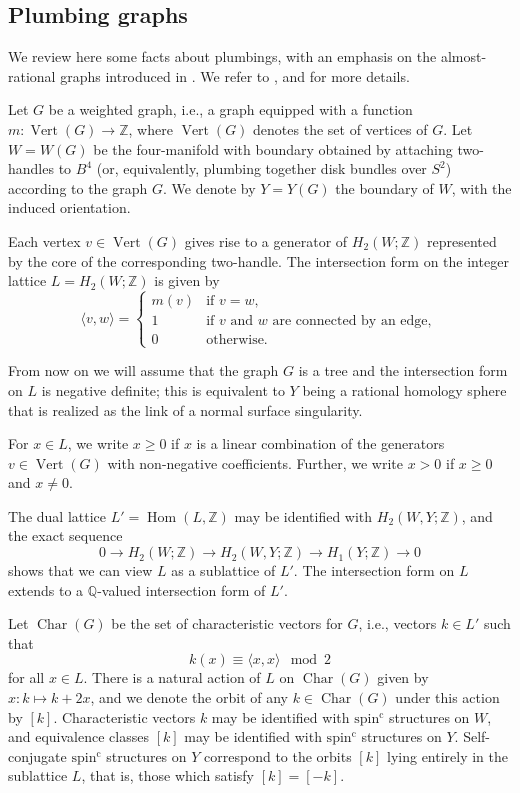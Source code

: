 \documentclass[11 pt]{amsart}
\theoremstyle{remark}
\newcommand\Z{\mathbb{Z}}
\newcommand\Q{\mathbb{Q}}
\def\spinc {{\operatorname{spin^c}}}
\DeclareMathOperator{\Hom}{Hom}
\def\Vert{\operatorname{Vert}}
\def\Char{\operatorname{Char}}
\begin{document}

\subsection{Plumbing graphs}
\label{sec:pg}
We review here some facts about plumbings, with an emphasis on the almost-rational graphs introduced in \cite{NemethiOS}. We refer to \cite{Neu}, \cite{Plumbed} and \cite{NemethiOS} for more details.

Let $G$ be a weighted graph, i.e., a graph equipped with a function $m: \Vert(G) \to \Z$, where $\Vert(G)$ denotes the set of vertices of $G$. Let $W=W(G)$ be the four-manifold with boundary obtained by attaching two-handles to $B^4$ (or, equivalently, plumbing together disk bundles over $S^2$) according to the graph $G$. We denote by $Y=Y(G)$ the boundary of $W$, with the induced orientation.

Each vertex $v \in \Vert(G)$ gives rise to a generator of $H_2(W; \Z)$ represented by the core of the corresponding two-handle. The intersection form on the integer lattice $L = H_2(W; \Z)$ is given by
$$ \langle v, w \rangle = \begin{cases}
m(v) & \text{if $v=w$},\\
1 & \text{if $v$ and $w$ are connected by an edge},\\
0 & \text{otherwise.}
\end{cases}$$

From now on we will assume that the graph $G$ is a tree and the intersection form on $L$ is negative definite; this is equivalent to $Y$ being a rational homology sphere that is realized as the link of a  normal surface singularity. 

For $x \in L$, we write $x \geq 0$ if $x$ is a linear combination of the generators $v \in \Vert(G)$ with non-negative coefficients. Further, we write $x > 0$ if $x \geq 0$ and $x \neq 0$. 

The dual lattice $L' = \Hom(L, \Z)$ may be identified with $H_2(W, Y; \Z)$, and the exact sequence
$$ 0 \to H_2(W; \Z) \to H_2(W, Y ; \Z) \to H_1(Y; \Z) \to 0$$
shows that we can view $L$ as a sublattice of $L'$. The intersection form on $L$ extends to a $\Q$-valued intersection form of $L'$.

Let $\Char(G)$ be the set of characteristic vectors for $G$, i.e., vectors $k \in L'$ such that 
$$k(x) \equiv \langle x, x \rangle \mod{2} $$
for all $x \in L$. There is a natural action of $L$ on $\Char(G)$ given by $x: k \mapsto k + 2x$, and we denote the orbit of any $k \in \Char(G)$ under this action by $[k]$. Characteristic vectors $k$ may be identified with $\spinc$ structures on $W$, and equivalence classes $[k]$ may be identified with $\spinc$ structures on $Y$. Self-conjugate $\spinc$ structures on $Y$ correspond to the orbits $[k]$ lying entirely in the sublattice $L$, that is, those which satisfy $[k] = [-k]$.
\end{document}
